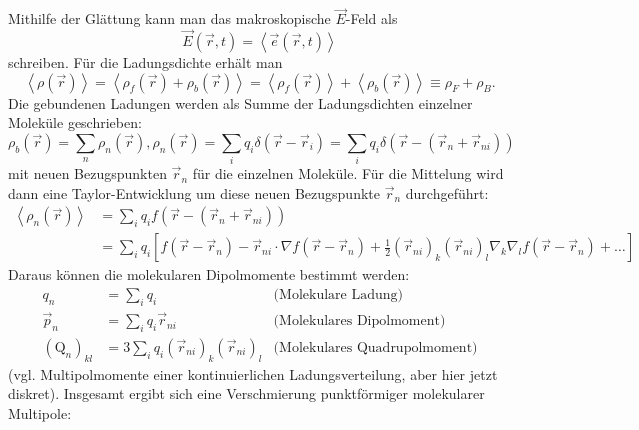 Mithilfe der Glättung kann man das makroskopische $\vec {E}$-Feld als
\begin{equation*}
	\vec {E}\left(\vec {r},t\right)=\left\langle \vec {e}\left(\vec {r},t\right)\right\rangle
\end{equation*}
schreiben. Für die Ladungsdichte erhält man
\begin{equation*}
	\left\langle \rho \left(\vec {r}\right)\right\rangle =\left\langle \rho _{f}\left(\vec {r}\right)+\rho _{b}\left(\vec {r}\right)\right\rangle =\left\langle \rho _{f}\left(\vec {r}\right)\right\rangle +\left\langle \rho _{b}\left(\vec {r}\right)\right\rangle \equiv \rho _{F}+\rho _{B}.
\end{equation*}
Die gebundenen Ladungen werden als Summe der Ladungsdichten einzelner Moleküle geschrieben:
\begin{equation*}
	\rho _{b}\left(\vec {r}\right)=\sum _{n}\rho _{n}\left(\vec {r}\right), \rho _{n}\left(\vec {r}\right)=\sum _{i}q_{i}\delta \left(\vec {r}-\vec {r}_{i}\right)=\sum _{i}q_{i}\delta \left(\vec {r}-\left(\vec {r}_{n}+\vec {r}_{ni}\right)\right)
\end{equation*}
mit neuen Bezugspunkten $\vec {r}_{n}$ für die einzelnen Moleküle. Für die Mittelung wird dann eine Taylor-Entwicklung um diese neuen Bezugspunkte $\vec {r}_{n}$ durchgeführt:
\begin{align*}
	\left\langle \rho _{n}\left(\vec {r}\right)\right\rangle &=\sum _{i}q_{i}f\left(\vec {r}-\left(\vec {r}_{n}+\vec {r}_{ni}\right)\right)\\&=\sum _{i}q_{i}\left[f\left(\vec {r}-\vec {r}_{n}\right)-\vec {r}_{ni}\cdot \nabla f\left(\vec {r}-\vec {r}_{n}\right)+\frac{1}{2}\left(\vec {r}_{ni}\right)_{k}\left(\vec {r}_{ni}\right)_{l}\nabla _{k}\nabla _{l}f\left(\vec {r}-\vec {r}_{n}\right)+\ldots \right]
\end{align*}
Daraus können die molekularen Dipolmomente bestimmt werden:
\begin{align*}
		q_{n}                            & =\sum _{i}q_{i} &\text{(Molekulare Ladung)}     \\
		\vec {p}_{n}                     & =\sum _{i}q_{i}\vec {r}_{ni} &\text{(Molekulares Dipolmoment)}    \\
		\left(\mathrm{Q}_{n}\right)_{kl} & =3\sum _{i}q_{i}\left(\vec {r}_{ni}\right)_{k}\left(\vec {r}_{ni}\right)_{l} &\text{(Molekulares Quadrupolmoment)}
\end{align*}
(vgl. Multipolmomente einer kontinuierlichen Ladungsverteilung, aber hier jetzt diskret). Insgesamt ergibt sich eine Verschmierung punktförmiger molekularer Multipole:
